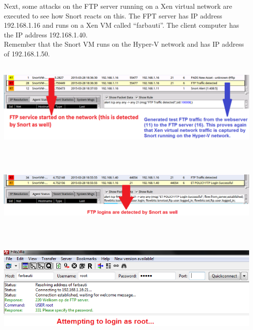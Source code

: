 \documentclass[11pt, a4paper]{article}
\begin{document}
Next, some attacks on the FTP server running on a Xen virtual network are executed to see how Snort reacts on this. The FPT server has IP address 192.168.1.16 and runs on a Xen VM called ``farbauti''. The client computer has the IP address 192.168.1.40. \\
Remember that the Snort VM runs on the Hyper-V network and has IP address of 192.168.1.50. \\ \\
\noindent\begin{minipage}{\textwidth}
    \centering
    \includegraphics[width=\textwidth]{FTP_1.png}
\end{minipage}
$\;$ \\ \\
\noindent\begin{minipage}{\textwidth}
    \centering
    \includegraphics[width=\textwidth]{FTP_2.png}
\end{minipage}
$\;$ \\ \\
\noindent\begin{minipage}{\textwidth}
    \centering
    \includegraphics[width=\textwidth]{FTP_4.png}
\end{minipage}
\end{document}
